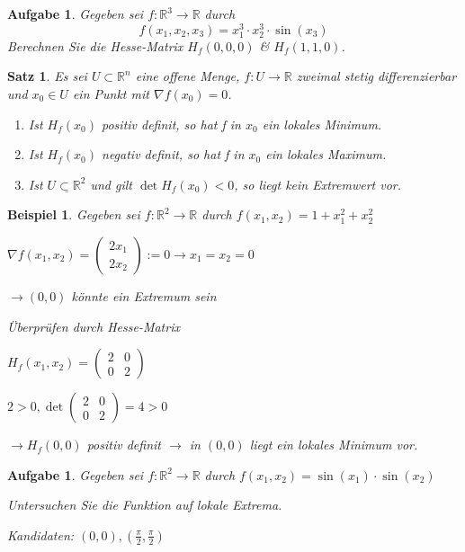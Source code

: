 \documentclass[12pt,a4paper]{scrreprt}
\newtheorem{beispiel}[defi]{Beispiel}
\newtheorem{satz}[defi]{Satz}
\newtheorem{aufg}[defi]{Aufgabe}
\begin{document}
\begin{aufg}
	Gegeben sei $f:\mathbb{R}^3\to\mathbb{R}$ durch
	\[f(x_1,x_2,x_3)=x_1^3 \cdot x_2^3 \cdot \sin(x_3)\]
	Berechnen Sie die Hesse-Matrix $H_f(0,0,0)$ \& $H_f(1,1,0)$.
\end{aufg}

\begin{satz}
	Es sei $U\subset\mathbb{R}^n$ eine offene Menge, $f:U\to\mathbb{R}$ zweimal stetig differenzierbar und $x_0\in U$ ein Punkt mit $\nabla f(x_0)=0$.
	\begin{enumerate}[label=(\roman*)]
		\item Ist $H_f(x_0)$ positiv definit, so hat f in $x_0$ ein lokales Minimum.
		\item Ist $H_f(x_0)$ negativ definit, so hat f in $x_0$ ein lokales Maximum.
		\item Ist $\underline{U\subset\mathbb{R}^2}$ und gilt $\det H_f(x_0) < 0$, so liegt kein Extremwert vor.
	\end{enumerate}
\end{satz}

\begin{beispiel}
	Gegeben sei $f:\mathbb{R}^2\to\mathbb{R}$ durch $f(x_1,x_2)=1+x_1^2+x_2^2$
	
	$\nabla f(x_1,x_2)=\begin{pmatrix}
	2x_1 \\ 2x_2
	\end{pmatrix} := 0 \to x_1=x_2=0$
	
	$\to (0,0)$ könnte ein Extremum sein
	
	Überprüfen durch Hesse-Matrix
	
	$H_f(x_1,x_2)=\begin{pmatrix}
	2 & 0 \\ 0 & 2
	\end{pmatrix}$
	
	$2>0, \det\begin{pmatrix}
	2 & 0 \\ 0 & 2
	\end{pmatrix}=4>0$
	
	$\to H_f(0,0)$ positiv definit $\to$ in $(0,0)$ liegt ein lokales Minimum vor.
\end{beispiel}

\begin{aufg}
	Gegeben sei $f:\mathbb{R}^2\to\mathbb{R}$ durch $f(x_1,x_2)=\sin(x_1)\cdot\sin(x_2)$
	
	Untersuchen Sie die Funktion auf lokale Extrema.
	
	Kandidaten: $(0,0),(\frac{\pi}{2},\frac{\pi}{2})$
\end{aufg}
\end{document}
